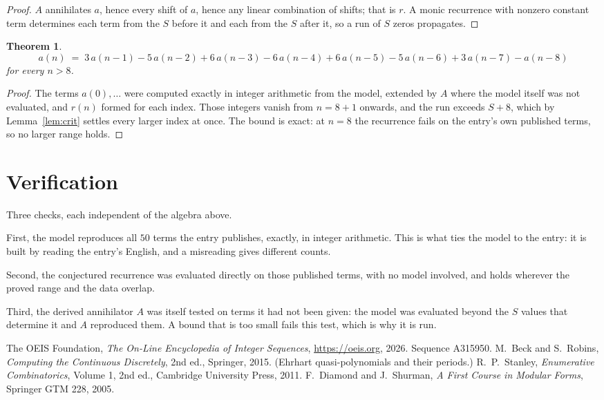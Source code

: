 \documentclass[11pt,a4paper]{article}
\theoremstyle{plain}
\newtheorem{theorem}{Theorem}
\theoremstyle{definition}
\begin{document}
\begin{proof}
$A$ annihilates $a$, hence every shift of $a$, hence any linear combination of shifts; that is
$r$. A monic recurrence with nonzero constant term determines each term from the $S$ before it
and each from the $S$ after it, so a run of $S$ zeros propagates.
\end{proof}

\begin{theorem}
\[
a(n)\;=\;3\,a(n-1) - 5\,a(n-2) + 6\,a(n-3) - 6\,a(n-4) + 6\,a(n-5) - 5\,a(n-6) + 3\,a(n-7) - a(n-8)
\]
for every $n>8$.
\end{theorem}

\begin{proof}
The terms $a(0),\dots$ were computed exactly in integer arithmetic from the model, extended by
$A$ where the model itself was not evaluated, and $r(n)$ formed for each index. Those integers
vanish from $n=8+1$ onwards, and the run exceeds $S+8$, which by
Lemma~\ref{lem:crit} settles every larger index at once. The bound is exact: at $n=8$ the recurrence fails on the entry's own published terms, so no larger range holds.
\end{proof}

\section{Verification}

Three checks, each independent of the algebra above.

First, the model reproduces all $50$ terms the entry publishes, exactly, in integer
arithmetic. This is what ties the model to the entry: it is built by reading the entry's
English, and a misreading gives different counts.

Second, the conjectured recurrence was evaluated directly on those published terms, with no
model involved, and holds wherever the proved range and the data overlap.

Third, the derived annihilator $A$ was itself tested on terms it had not been given: the model
was evaluated beyond the $S$ values that determine it and $A$ reproduced them. A bound that is
too small fails this test, which is why it is run.

\begin{thebibliography}{9}
 The OEIS Foundation, \emph{The On-Line Encyclopedia of Integer
Sequences}, \url{https://oeis.org}, 2026. Sequence A315950.
 M.~Beck and S.~Robins, \emph{Computing the Continuous Discretely},
2nd ed., Springer, 2015. (Ehrhart quasi-polynomials and their periods.)
 R.~P.~Stanley, \emph{Enumerative Combinatorics}, Volume 1, 2nd ed.,
Cambridge University Press, 2011.
 F.~Diamond and J.~Shurman, \emph{A First Course in Modular Forms},
Springer GTM 228, 2005.
\end{thebibliography}
\end{document}
